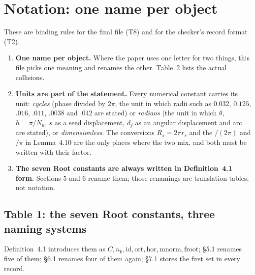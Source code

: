 \documentclass[11pt]{article}
\begin{document}
\section*{Notation: one name per object}

These are binding rules for the final file (T8) and for the checker's record format (T2).

\begin{enumerate}
\item \textbf{One name per object.} Where the paper uses one letter for two things, this file picks
  one meaning and renames the other. Table~2 lists the actual collisions.
\item \textbf{Units are part of the statement.} Every numerical constant carries its unit:
  \emph{cycles} (phase divided by $2\pi$, the unit in which radii such as $0.032$, $0.125$, $.016$,
  $.011$, $.0038$ and $.042$ are stated) or \emph{radians} (the unit in which $\theta$, $h=\pi/N_u$,
  $s$ as a seed displacement, $d_j$ as an angular displacement and arc are stated), or
  \emph{dimensionless}. The conversions $R_s = 2\pi r_s$ and the $/(2\pi)$ and $/\pi$ in
  Lemma~4.10 are the only places where the two mix, and both must be written with their factor.
\item \textbf{The seven Root constants are always written in Definition~4.1 form.}
  Sections 5 and 6 rename them; those renamings are translation tables, not notation.
\end{enumerate}

\subsection*{Table 1: the seven Root constants, three naming systems}

Definition~4.1 introduces them as $C,n_0,\mathrm{id},\mathrm{ort},\mathrm{hor},\mathrm{mnorm},\mathrm{froot}$;
\S5.1 renames five of them; \S6.1 renames four of them again; \S7.1 stores the first set in every record.
\end{document}
